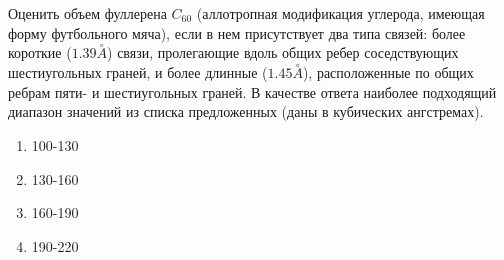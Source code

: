 
Оценить объем фуллерена $C_{60}$ (аллотропная модификация углерода, имеющая форму футбольного мяча), 
если в нем присутствует два типа связей: более короткие ($1.39 \stackrel{\circ}{A}$) связи, пролегающие 
вдоль общих ребер соседствующих шестиугольных граней, и более длинные ($1.45 \stackrel{\circ}{A}$), 
расположенные по общих ребрам пяти- и шестиугольных граней. В качестве ответа наиболее подходящий 
диапазон значений из списка предложенных (даны в кубических ангстремах).

\begin{enumerate}
    \item 100-130
    \item 130-160
    \item 160-190
    \item 190-220
\end{enumerate}

